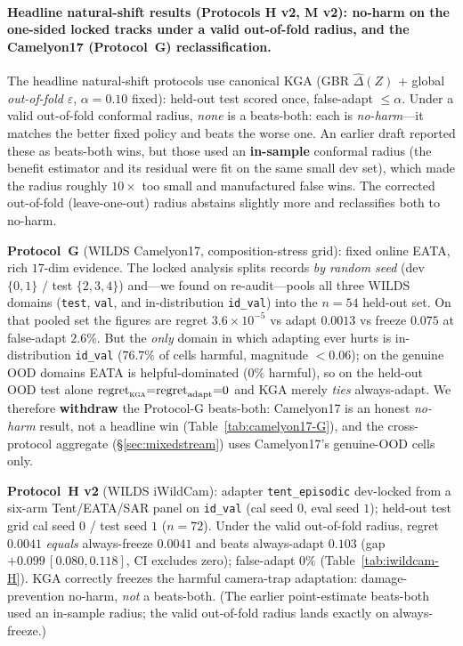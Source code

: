 \documentclass[conference]{IEEEtran}
\theoremstyle{plain}
\theoremstyle{definition}
\begin{document}
\paragraph{Headline natural-shift results (Protocols H v2, M v2): no-harm on the one-sided locked tracks under a valid out-of-fold radius, and the Camelyon17 (Protocol~G) reclassification.}
The headline natural-shift protocols use canonical \textsc{KGA} (GBR $\widehat\Delta(Z)$ + global
\emph{out-of-fold} $\varepsilon$, $\alpha{=}0.10$ fixed): held-out test scored once, false-adapt
$\le\alpha$. Under a valid out-of-fold conformal radius, \emph{none} is a beats-both: each is
\emph{no-harm}---it matches the better fixed policy and beats the worse one. An earlier draft
reported these as beats-both wins, but those used an \textbf{in-sample} conformal radius (the
benefit estimator and its residual were fit on the same small dev set), which made the radius
roughly $10\times$ too small and manufactured false wins. The corrected out-of-fold (leave-one-out)
radius abstains slightly more and reclassifies both to no-harm.

\textbf{Protocol~G} (WILDS Camelyon17, composition-stress grid): fixed online EATA, rich
$17$-dim evidence. The locked analysis splits records \emph{by random seed} (dev $\{0,1\}$ /
test $\{2,3,4\}$) and---we found on re-audit---pools all three WILDS domains (\texttt{test},
\texttt{val}, and in-distribution \texttt{id\_val}) into the $n{=}54$ held-out set. On that
pooled set the figures are regret $3.6{\times}10^{-5}$ vs adapt $0.0013$ vs freeze $0.075$ at
false-adapt $2.6\%$. But the \emph{only} domain in which adapting ever hurts is in-distribution
\texttt{id\_val} ($76.7\%$ of cells harmful, magnitude ${<}0.06$); on the genuine OOD domains
EATA is helpful-dominated ($0\%$ harmful), so on the held-out OOD test alone
$\mathrm{regret}_{\textsc{kga}}{=}\mathrm{regret}_{\text{adapt}}{=}0$ and \textsc{KGA} merely
\emph{ties} always-adapt. We therefore \textbf{withdraw} the Protocol-G beats-both: Camelyon17
is an honest \emph{no-harm} result, not a headline win (Table~\ref{tab:camelyon17-G}), and the
cross-protocol aggregate (\S\ref{sec:mixedstream}) uses Camelyon17's genuine-OOD cells only.

\textbf{Protocol~H v2} (WILDS iWildCam): adapter \texttt{tent\_episodic} dev-locked from a
six-arm Tent/EATA/SAR panel on \texttt{id\_val} (cal seed $0$, eval seed $1$); held-out
test grid cal seed $0$ / test seed $1$ ($n{=}72$). Under the valid out-of-fold radius, regret
$0.0041$ \emph{equals} always-freeze $0.0041$ and beats always-adapt $0.103$ (gap
$+0.099\,[0.080,0.118]$, CI excludes zero); false-adapt $0\%$ (Table~\ref{tab:iwildcam-H}).
\textsc{KGA} correctly freezes the harmful camera-trap adaptation: damage-prevention no-harm,
\emph{not} a beats-both. (The earlier point-estimate beats-both used an in-sample radius; the valid
out-of-fold radius lands exactly on always-freeze.)
\end{document}
